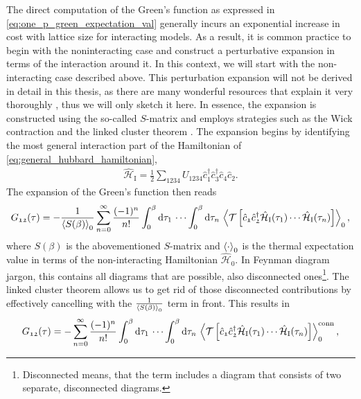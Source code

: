 \documentclass[../../main.tex]{subfiles}
\begin{document}
The direct computation of the Green's function as expressed in \eqref{eq:one_p_green_expectation_val} generally incurs an exponential increase in cost with lattice size for interacting models. As a result, it is common practice to begin with the noninteracting case and construct a perturbative expansion in terms of the interaction around it. In this context, we will start with the non-interacting case described above. This perturbation expansion will not be derived in detail in this thesis, as there are many wonderful resources that explain it very thoroughly \cite{Abrikosov, Nolting}, thus we will only sketch it here. In essence, the expansion is constructed using the so-called $S$-matrix and employs strategies such as the Wick contraction \cite{Wick, evaluation of collision matrix and Notes on wick's theorem} and the linked cluster theorem \cite{linked cluster chapter in book}. The expansion begins by identifying the most general interaction part of the Hamiltonian of \eqref{eq:general_hubbard_hamiltonian},
\begin{align}
	\hat{\mathcal{H}}_{\text{I}} = \frac12 \sum_{\mathfrak{1234}}U_{\mathfrak{1234}}\hat c^{\dagger}_{\mathfrak{1}}\hat c^{\dagger}_{\mathfrak{3}}\hat c_{\mathfrak{4}}\hat c_{\mathfrak{2}}.
\end{align}
The expansion of the Green's function then reads
\begin{align}
	G_{\mathfrak{12}}(\tau)=-\frac{1}{\left\langle S(\beta)\right\rangle_0}\sum_{n=0}^{\infty}\frac{(-1)^n}{n!}\int_{0}^{\beta}\text{d}\tau_1\,\cdots\int_{0}^{\beta}\text{d}\tau_n\,\left\langle \mathcal{T}\left [\hat{c}_{\mathfrak{1}}\hat{c}^{\dagger}_{\mathfrak{2}}\hat{\mathcal{H}}_{\text{I}}(\tau_1)\cdots \hat{\mathcal{H}}_{\text{I}}(\tau_n) \right ]\right\rangle_0,
\end{align}
where $S(\beta)$ is the abovementioned $S$-matrix and $\left\langle \cdot\right\rangle_0$ is the thermal expectation value in terms of the non-interacting Hamiltonian $\hat{\mathcal{H}}_0$. 
In Feynman diagram jargon, this contains all diagrams that are possible, also disconnected ones\footnote{Disconnected means, that the term includes a diagram that consists of two separate, disconnected diagrams.}. The linked cluster theorem allows us to get rid of those disconnected contributions by effectively cancelling with the $\frac{1}{\left\langle S(\beta)\right\rangle_0}$ term in front. This results in
\begin{align}\label{eq:one_p_green_full_perturbation_exp}
	G_{\mathfrak{12}}(\tau)=-\sum_{n=0}^{\infty}\frac{(-1)^n}{n!}\int_{0}^{\beta}\text{d}\tau_1\,\cdots\int_{0}^{\beta}\text{d}\tau_n\,\left\langle \mathcal{T}\left [\hat{c}_{\mathfrak{1}}\hat{c}^{\dagger}_{\mathfrak{2}}\hat{\mathcal{H}}_{\text{I}}(\tau_1)\cdots \hat{\mathcal{H}}_{\text{I}}(\tau_n) \right ]\right\rangle_0^{\text{conn}},
\end{align}
\end{document}
